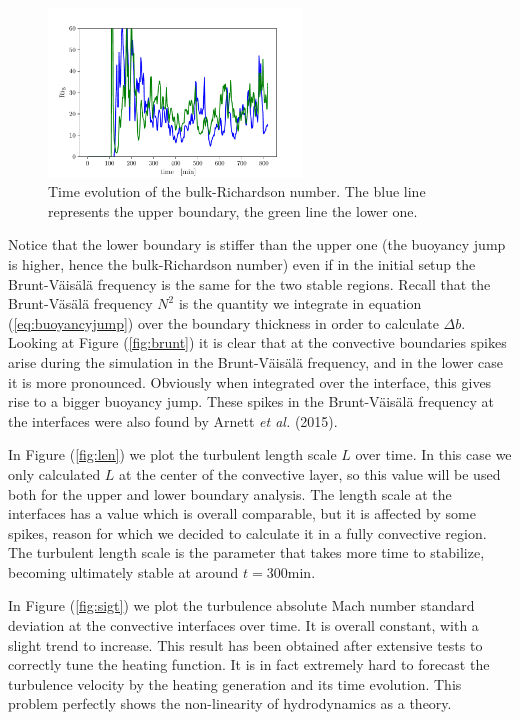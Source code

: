 \begin{figure}[t!]
\centering
\includegraphics[width=0.6\textwidth]{./img/bulk.pdf}
\caption{Time evolution of the bulk-Richardson number. The blue line represents the upper boundary, the green line the lower one.}
\label{fig:bulk}
\centering
\end{figure}
Notice that the lower boundary is stiffer than the upper one (the buoyancy jump is higher, hence the bulk-Richardson number) even if in the initial setup the Brunt-Väisälä frequency is the same for the two stable regions. Recall that the Brunt-Väsälä frequency $N^2$ is the quantity we integrate in equation (\ref{eq:buoyancyjump}) over the boundary thickness in order to calculate $\Delta b$. Looking at Figure (\ref{fig:brunt}) it is clear that at the convective boundaries spikes arise during the simulation in the Brunt-Väisälä frequency, and in the lower case it is more pronounced. Obviously when integrated over the interface, this gives rise to a bigger buoyancy jump. These spikes in the Brunt-Väisälä frequency at the interfaces were also found by Arnett \emph{et al.} (2015).

In Figure (\ref{fig:len}) we plot the turbulent length scale $L$ over time. In this case we only calculated $L$ at the center of the convective layer, so this value will be used both for the upper and lower boundary analysis. The length scale at the interfaces has a value which is overall comparable, but it is affected by some spikes, reason for which we decided to calculate it in a fully convective region. The turbulent length scale is the parameter that takes more time to stabilize, becoming ultimately stable at around $t = 300 \mathrm{min}$. 
 
In Figure (\ref{fig:sigt}) we plot the turbulence absolute Mach number standard deviation at the convective interfaces over time. It is overall constant, with a slight trend to increase. This result has been obtained after extensive tests to correctly tune the heating function. It is in fact extremely hard to forecast the turbulence velocity by the heating generation and its time evolution. This problem perfectly shows the non-linearity of hydrodynamics as a theory.


